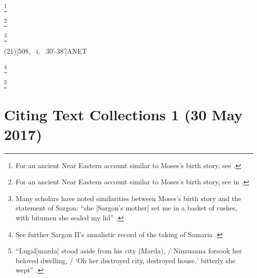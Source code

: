 \documentclass[a4paper]{article}
\begin{document}
\begin{fverbcite}{13}
  \footnote{For an ancient Near Eastern account similar to Moses’s birth
    story, see .}
\end{fverbcite}
\begin{fverbcite}{13}
  \footnote{For an ancient Near Eastern account similar to Moses’s birth
    story, see  in .}
\end{fverbcite}
\begin{fverbcite}{13}
  \footnote{Many scholars have noted similarities between Moses’s birth story
    and the statement of Sargon: “she [Sargon’s mother] set me in a basket of
    rushes, with bitumen she sealed my lid” .}
\end{fverbcite}
\examplecite(21)[508, \colno~i, \linesno~30′-38′]{ANET}
\begin{fverbcite}{37}
  \footnote{See further Sargon II’s annalistic record of the taking of Samaria
    \parencite[284-285, \linesno~23-26]{ANET}.}
\end{fverbcite}
\begin{fverbcite}{42}
  \footnote{“Lugal[marda] stood aside from his city (Marda), / Ninzuanna
    forsook her beloved dwelling, / ‘Oh her destroyed city, destroyed house,’
    bitterly she wept” .}
\end{fverbcite}
\exampleabbreviations
{}

\section{Citing Text Collections 1 (30 May 2017)}
\end{document}
